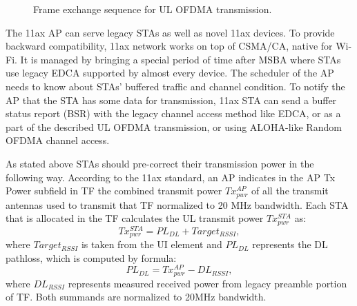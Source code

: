 \begin{figure}[t]
\begin{scaletikzpicturetowidth}{0.8\textwidth}
		\end{scaletikzpicturetowidth}
	\caption{\label{fig:transmission} Frame exchange sequence for UL OFDMA transmission.}
	\vspace{-0.5em}
\end{figure}

The 11ax AP can serve legacy STAs as well as novel 11ax devices. 
To provide backward compatibility, 11ax network works on top of CSMA/CA, native for Wi-Fi.
It is managed by bringing a special period of time after MSBA where STAs use legacy EDCA supported by almost every device. 
The scheduler of the AP needs to know about STAs' buffered traffic and channel condition.
To notify the AP that the STA has some data for transmission, 11ax STA can send a buffer status report (BSR) with the legacy channel access method like EDCA, or as a part of the described UL OFDMA transmission, or using ALOHA-like Random OFDMA channel access.

As stated above STAs should pre-correct their transmission power in the following way. 
According to the 11ax standard, an AP indicates in the AP Tx Power  subfield in TF the combined transmit power $Tx^{AP}_{pwr}$ of all the transmit antennas used to transmit that TF normalized to 20 MHz bandwidth. 
Each STA that is allocated in the TF calculates the UL transmit power $Tx_{pwr}^{STA}$ as:
\begin{equation}
Tx_{pwr}^{STA} = PL_{DL} + Target_{RSSI},
\end{equation}
where $Target_{RSSI}$ is taken from the UI element and $PL_{DL}$ represents the DL pathloss, which is computed by formula:
\begin{equation}
PL_{DL} = Tx^{AP}_{pwr} - DL_{RSSI},
\end{equation}
where $DL_{RSSI}$ represents measured received power from legacy preamble portion of TF. Both summands are normalized to 20MHz bandwidth. 

